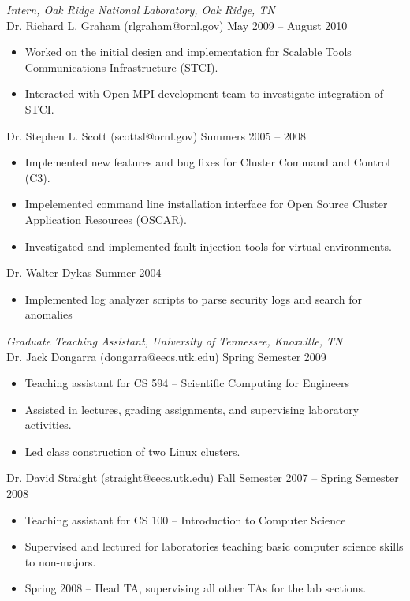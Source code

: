 {\sl Intern, Oak Ridge National Laboratory, Oak Ridge, TN} \\
Dr. Richard L. Graham (rlgraham@ornl.gov) \hfill May 2009 -- August 2010 
\begin{itemize} \itemsep -2pt %
        \item Worked on the initial design and implementation for Scalable
            Tools Communications Infrastructure (STCI).
        \item Interacted with Open MPI development team to investigate
            integration of STCI.
\end{itemize} 
Dr. Stephen L. Scott (scottsl@ornl.gov) \hfill Summers 2005 -- 2008
\begin{itemize} \itemsep -2pt
        \item Implemented new features and bug fixes for Cluster Command and
            Control (C3).
        \item Impelemented command line installation interface for Open Source
            Cluster Application Resources (OSCAR).
        \item Investigated and implemented fault injection tools for virtual
            environments.
\end{itemize}
Dr. Walter Dykas \hfill Summer 2004
\begin{itemize} \itemsep -2pt
        \item Implemented log analyzer scripts to parse security logs and
            search for anomalies
\end{itemize}

{\sl Graduate Teaching Assistant, University of Tennessee, Knoxville, TN} \\
Dr. Jack Dongarra (dongarra@eecs.utk.edu) \hfill Spring Semester 2009
\begin{itemize} \itemsep -2pt
        \item Teaching assistant for CS 594 -- Scientific Computing for
            Engineers
        \item Assisted in lectures, grading assignments, and supervising
            laboratory activities.
        \item Led class construction of two Linux clusters.
\end{itemize}
Dr. David Straight (straight@eecs.utk.edu) \hfill Fall Semester 2007 -- Spring Semester 2008
\begin{itemize} \itemsep -2pt
        \item Teaching assistant for CS 100 -- Introduction to Computer
            Science
        \item Supervised and lectured for laboratories teaching basic computer
            science skills to non-majors.
        \item Spring 2008 -- Head TA, supervising all other TAs for the lab
            sections.
\end{itemize}
